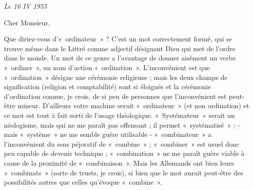 {\em{}
Le 16 IV 1955

Cher Monsieur,

Que diriez-vous d'«~ordinateur~» ? C'est un mot correctement formé, qui se trouve même dans le
Littré comme adjectif désignant Dieu qui met de l'ordre dans le monde. Un mot de ce genre a
l'avantage de donner aisément un verbe «~ordiner~», un nom d'action «~ordination~». L'inconvénient
est que «~ordination~» désigne une cérémonie religieuse ; mais les deux champs de signification
(religion et comptabilité) sont si éloignés et la cérémonie d'ordination connue, je crois, de si peu de
personnes que l'inconvénient est peut-être mineur. D'ailleurs votre machine serait «~ordinateur~» (et
non ordination) et ce mot est tout à fait sorti de l'usage théologique. «~Systémateur~» serait un
néologisme, mais qui ne me paraît pas offensant ; il permet «~systématisé~» ; - mais «~système~» ne
me semble guère utilisable - «~combinateur~» a l'inconvénient du sens péjoratif de «~combine~» ;
«~combiner~» est usuel donc peu capable de devenir technique ; «~combination~» ne me paraît guère
viable à cause de la proximité de «~combinaison~». Mais les Allemands ont bien leurs «~combinats~»
(sorte de trusts, je crois), si bien que le mot aurait peut-être des possibilités autres que celles
qu'évoque «~combine~».

}

